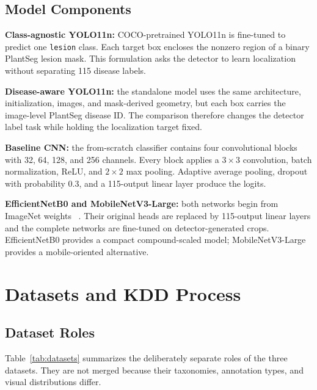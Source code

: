 \documentclass[conference]{IEEEtran}
\begin{document}
\subsection{Model Components}

\textbf{Class-agnostic YOLO11n:} COCO-pretrained YOLO11n is fine-tuned to predict one \texttt{lesion}
class. Each target box encloses the nonzero region of a binary PlantSeg lesion mask. This formulation
asks the detector to learn localization without separating 115 disease labels.

\textbf{Disease-aware YOLO11n:} the standalone model uses the same architecture, initialization,
images, and mask-derived geometry, but each box carries the image-level PlantSeg disease ID. The
comparison therefore changes the detector label task while holding the localization target fixed.

\textbf{Baseline CNN:} the from-scratch classifier contains four convolutional blocks with 32, 64,
128, and 256 channels. Every block applies a $3\times3$ convolution, batch normalization, ReLU, and
$2\times2$ max pooling. Adaptive average pooling, dropout with probability 0.3, and a 115-output
linear layer produce the logits.

\textbf{EfficientNetB0 and MobileNetV3-Large:} both networks begin from ImageNet weights
~\cite{deng2009imagenet}. Their original heads are replaced by 115-output linear layers and the
complete networks are fine-tuned on detector-generated crops. EfficientNetB0 provides a compact
compound-scaled model; MobileNetV3-Large provides a mobile-oriented alternative.

\section{Datasets and KDD Process}

\subsection{Dataset Roles}

Table~\ref{tab:datasets} summarizes the deliberately separate roles of the three datasets. They are
not merged because their taxonomies, annotation types, and visual distributions differ.
\end{document}
